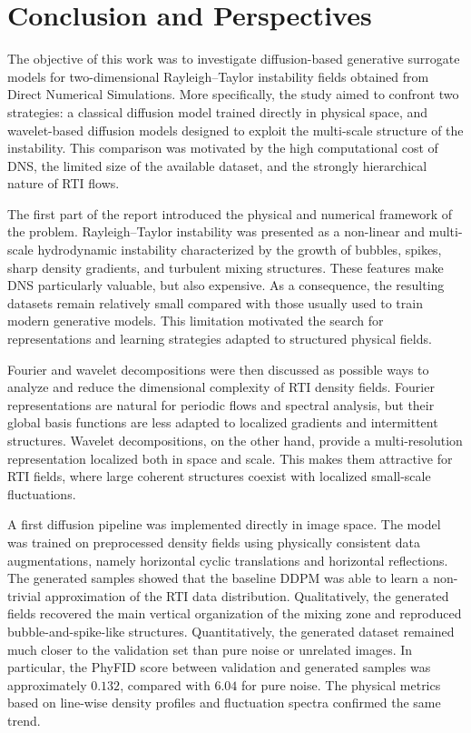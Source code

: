 ﻿\chapter{Conclusion and Perspectives}
\label{chap:conclusion}

The objective of this work was to investigate diffusion-based generative
surrogate models for two-dimensional Rayleigh--Taylor instability fields
obtained from Direct Numerical Simulations. More specifically, the study aimed
to confront two strategies: a classical diffusion model trained directly in
physical space, and wavelet-based diffusion models designed to exploit the
multi-scale structure of the instability. This comparison was motivated by the
high computational cost of DNS, the limited size of the available dataset, and
the strongly hierarchical nature of RTI flows.

The first part of the report introduced the physical and numerical framework of
the problem. Rayleigh--Taylor instability was presented as a non-linear and
multi-scale hydrodynamic instability characterized by the growth of bubbles,
spikes, sharp density gradients, and turbulent mixing structures. These
features make DNS particularly valuable, but also expensive. As a consequence,
the resulting datasets remain relatively small compared with those usually used
to train modern generative models. This limitation motivated the search for
representations and learning strategies adapted to structured physical fields.

Fourier and wavelet decompositions were then discussed as possible ways to
analyze and reduce the dimensional complexity of RTI density fields. Fourier
representations are natural for periodic flows and spectral analysis, but their
global basis functions are less adapted to localized gradients and intermittent
structures. Wavelet decompositions, on the other hand, provide a
multi-resolution representation localized both in space and scale. This makes
them attractive for RTI fields, where large coherent structures coexist with
localized small-scale fluctuations.

A first diffusion pipeline was implemented directly in image space. The model
was trained on preprocessed density fields using physically consistent data
augmentations, namely horizontal cyclic translations and horizontal
reflections. The generated samples showed that the baseline DDPM was able to
learn a non-trivial approximation of the RTI data distribution. Qualitatively,
the generated fields recovered the main vertical organization of the mixing
zone and reproduced bubble-and-spike-like structures. Quantitatively, the
generated dataset remained much closer to the validation set than pure noise or
unrelated images. In particular, the PhyFID score between validation and
generated samples was approximately $0.132$, compared with $6.04$ for pure
noise. The physical metrics based on line-wise density profiles and fluctuation
spectra confirmed the same trend.

